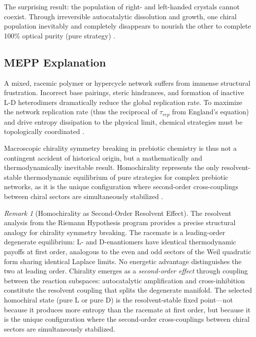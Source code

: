 \documentclass[12pt,a4paper]{article}
\theoremstyle{remark}
\newtheorem{remark}{Remark}
\begin{document}
The surprising result: the population of right- and left-handed crystals cannot coexist. Through irreversible autocatalytic dissolution and growth, one chiral population inevitably and completely disappears to nourish the other to complete 100\% optical purity (pure strategy) \citep{HomochiralityThermo}.

\subsection{MEPP Explanation}

A mixed, racemic polymer or hypercycle network suffers from immense structural frustration. Incorrect base pairings, steric hindrances, and formation of inactive L-D heterodimers dramatically reduce the global replication rate. To maximize the network replication rate (thus the reciprocal of $\tau_{rep}$ from England's equation) and drive entropy dissipation to the physical limit, chemical strategies must be topologically coordinated \citep{Biochirality}.

Macroscopic chirality symmetry breaking in prebiotic chemistry is thus not a contingent accident of historical origin, but a mathematically and thermodynamically inevitable result. Homochirality represents the only resolvent-stable thermodynamic equilibrium of pure strategies for complex prebiotic networks, as it is the unique configuration where second-order cross-couplings between chiral sectors are simultaneously stabilized \citep{Biochirality}.

\begin{remark}[Homochirality as Second-Order Resolvent Effect]
\label{rem:chirality-resolvent}
The resolvent analysis from the Riemann Hypothesis program \citep{GeigerRH2026b} provides a precise structural analogy for chirality symmetry breaking. The racemate is a leading-order degenerate equilibrium: L- and D-enantiomers have identical thermodynamic payoffs at first order, analogous to the even and odd sectors of the Weil quadratic form sharing identical Laplace limits. No energetic advantage distinguishes the two at leading order. Chirality emerges as a \emph{second-order effect} through coupling between the reaction subspaces: autocatalytic amplification and cross-inhibition constitute the resolvent coupling that splits the degenerate manifold. The selected homochiral state (pure L or pure D) is the resolvent-stable fixed point---not because it produces more entropy than the racemate at first order, but because it is the unique configuration where the second-order cross-couplings between chiral sectors are simultaneously stabilized.
\end{remark}
\end{document}
